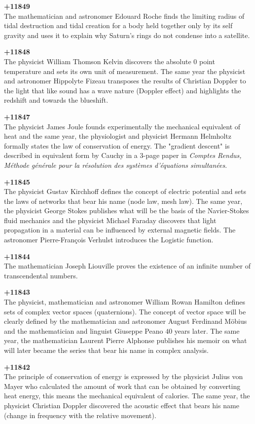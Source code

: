 \textbf{+11849}\\
The mathematician and astronomer Edouard Roche finds the limiting radius of tidal destruction and tidal creation for a body held together only by its self gravity and uses it to explain why Saturn's rings do not condense into a satellite.

\textbf{+11848}\\
The physicist William Thomson Kelvin discovers the absolute 0 point temperature and sets its own unit of measurement. The same year the physicist and astronomer Hippolyte Fizeau transposes the results of Christian Doppler to the light that like sound has a wave nature (Doppler effect) and highlights the redshift and towards the blueshift.

\textbf{+11847}\\
The physicist James Joule founds experimentally the mechanical equivalent of heat and the same year, the physiologist and physicist Hermann Helmholtz formally states the law of conservation of energy. The "gradient descent" is described in equivalent form by Cauchy in a 3-page paper in \textit{Comptes Rendus, Méthode générale pour la résolution des systèmes d'équations simultanées}.

\textbf{+11845}\\
The physicist Gustav Kirchhoff defines the concept of electric potential and sets the laws of networks that bear his name (node law, mesh law). The same year, the physicist George Stokes publishes what will be the basis of the Navier-Stokes fluid mechanics and the physicist Michael Faraday discovers that light propagation in a material can be influenced by external magnetic fields. The astronomer Pierre-François Verhulst introduces the Logistic function.

\textbf{+11844}\\
The mathematician Joseph Liouville proves the existence of an infinite number of transcendental numbers.

\textbf{+11843}\\
The physicist, mathematician and astronomer William Rowan Hamilton defines sets of complex vector spaces (quaternions). The concept of vector space will be clearly defined by the mathematician and astronomer August Ferdinand Möbius and the mathematician and linguist Giuseppe Peano $40$ years later. The same year, the mathematician Laurent Pierre Alphonse publishes his memoir on what will later became the series that bear his name in complex analysis.

\textbf{+11842}\\
The principle of conservation of energy is expressed by the physicist Julius von Mayer who calculated the amount of work that can be obtained by converting heat energy, this means the mechanical equivalent of calories. The same year, the physicist Christian Doppler discovered the acoustic effect that bears his name (change in frequency with the relative movement).

